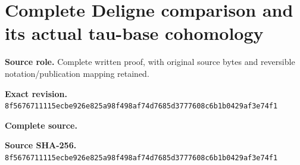 \begingroup
\sloppy
\small
\section{Complete Deligne comparison and its actual tau-base cohomology}
\noindent\textbf{Source role.} Complete written proof, with original source bytes and reversible notation/publication mapping retained.\par
\noindent\textbf{Exact revision.} \nolinkurl{8f5676711115ecbe926e825a98f498af74d7685d3777608c6b1b0429af3e74f1}\par
\noindent\textbf{Complete source.} \par
\noindent\textbf{Source SHA-256.} \nolinkurl{8f5676711115ecbe926e825a98f498af74d7685d3777608c6b1b0429af3e74f1}\par\medskip

\endgroup
